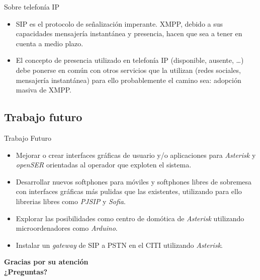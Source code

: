 \documentclass{beamer}
\begin{document}
\begin{frame}
  \begin{block}{Sobre telefonía IP}
    \begin{itemize}
    \item SIP es el protocolo de señalización imperante. XMPP, debido a sus capacidades mensajería instantánea y presencia, hacen que sea a tener en cuenta a medio plazo.
    \item El concepto de presencia utilizado en telefonía IP (disponible, ausente, \ldots) debe ponerse en común con otros servicios que la utilizan (redes sociales, mensajería instantánea) para ello probablemente el camino sea: adopción masiva de XMPP.
    \end{itemize}
  \end{block}
\end{frame}


\subsection{Trabajo futuro}

\begin{frame}
  \begin{block}{Trabajo Futuro}
    \begin{itemize}
    \item Mejorar o crear interfaces gráficas de usuario y/o aplicaciones para \emph{Asterisk} y \emph{openSER} orientadas al operador que exploten el sistema.
    \item Desarrollar nuevos softphones para móviles y softphones libres de sobremesa con interfaces gráficas más pulidas que las existentes, utilizando para ello librerias libres como \emph{PJSIP}  y \emph{Sofia}.
    \item Explorar las posibilidades como centro de domótica de \emph{Asterisk} utilizando microordenadores como \emph{Arduino}.
    \item Instalar un \emph{gateway} de SIP a PSTN en el CITI utilizando \emph{Asterisk}.
    \end{itemize}
  \end{block}
\end{frame}


\begin{frame}
  \begin{center}
    \huge{\textbf{Gracias por su atención\\¿Preguntas?}}
  \end{center}
\end{frame}
\end{document}
